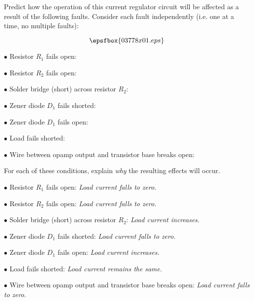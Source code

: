 

Predict how the operation of this current regulator circuit will be affected as a result of the following faults.  Consider each fault independently (i.e. one at a time, no multiple faults):

$$\epsfbox{03778x01.eps}$$

\medskip
\item{$\bullet$} Resistor $R_1$ fails open:
\vskip 5pt
\item{$\bullet$} Resistor $R_2$ fails open:
\vskip 5pt
\item{$\bullet$} Solder bridge (short) across resistor $R_2$:
\vskip 5pt
\item{$\bullet$} Zener diode $D_1$ fails shorted:
\vskip 5pt
\item{$\bullet$} Zener diode $D_1$ fails open:
\vskip 5pt
\item{$\bullet$} Load fails shorted:
\vskip 5pt
\item{$\bullet$} Wire between opamp output and transistor base breaks open:
\medskip

For each of these conditions, explain {\it why} the resulting effects will occur.







\medskip
\item{$\bullet$} Resistor $R_1$ fails open: {\it Load current falls to zero.}
\vskip 5pt
\item{$\bullet$} Resistor $R_2$ fails open: {\it Load current falls to zero.}
\vskip 5pt
\item{$\bullet$} Solder bridge (short) across resistor $R_2$: {\it Load current increases.}
\vskip 5pt
\item{$\bullet$} Zener diode $D_1$ fails shorted: {\it Load current falls to zero.}
\vskip 5pt
\item{$\bullet$} Zener diode $D_1$ fails open: {\it Load current increases.}
\vskip 5pt
\item{$\bullet$} Load fails shorted: {\it Load current remains the same.}
\vskip 5pt
\item{$\bullet$} Wire between opamp output and transistor base breaks open: {\it Load current falls to zero.}
\medskip

